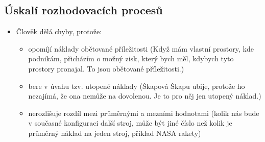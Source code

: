 \subsection{Úskalí rozhodovacích procesů}
\begin{itemize}
    \item Člověk dělá chyby, protože:
    \begin{itemize}
        \item opomíjí náklady obětované příležitosti (Když mám vlastní prostory, kde podnikám, přicházím o možný zisk, který bych měl, kdybych tyto prostory pronajal. To jsou obětované příležitosti.)
        \item bere v úvahu tzv. utopené náklady (Škapová Škapu ubije, protože ho nezajímá, že ona nemůže na dovolenou. Je to pro něj jen utopený náklad.)
        \item nerozlišuje rozdíl mezi průměrnými a mezními hodnotami (kolik nás bude v současné konfiguraci další stroj, může být jiné číslo než kolik je průměrný náklad na jeden stroj, příklad NASA rakety)
    \end{itemize}
\end{itemize}
